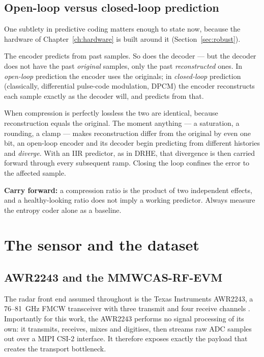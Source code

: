 \subsection{Open-loop versus closed-loop prediction}
\label{sec:closedloop}

One subtlety in predictive coding matters enough to state now, because the
hardware of Chapter~\ref{ch:hardware} is built around it
(Section~\ref{sec:robust}).

The encoder predicts from past samples. So does the decoder --- but the decoder
does not have the past \emph{original} samples, only the past
\emph{reconstructed} ones. In \emph{open-loop} prediction the encoder uses the
originals; in \emph{closed-loop} prediction (classically, differential
pulse-code modulation, DPCM) the encoder reconstructs each sample exactly as
the decoder will, and predicts from that.

When compression is perfectly lossless the two are identical, because
reconstruction equals the original. The moment anything --- a saturation, a
rounding, a clamp --- makes reconstruction differ from the original by even one
bit, an open-loop encoder and its decoder begin predicting from different
histories and \emph{diverge}. With an IIR predictor, as in DRHE, that
divergence is then carried forward through every subsequent ramp. Closing the
loop confines the error to the affected sample.

\begin{keybox}
\textbf{Carry forward:} a compression ratio is the product of two independent
effects, and a healthy-looking ratio does not imply a working predictor. Always
measure the entropy coder alone as a baseline.
\end{keybox}

\section{The sensor and the dataset}
\label{sec:sensor}

\subsection{AWR2243 and the MMWCAS-RF-EVM}

The radar front end assumed throughout is the Texas Instruments AWR2243, a
76--\SI{81}{\giga\hertz} FMCW transceiver with three transmit and four receive
channels \cite{ti_awr2243}. Importantly for this work, the AWR2243 performs no
signal processing of its own: it transmits, receives, mixes and digitises, then
streams raw ADC samples out over a MIPI CSI-2 interface. It therefore exposes
exactly the payload that creates the transport bottleneck.

